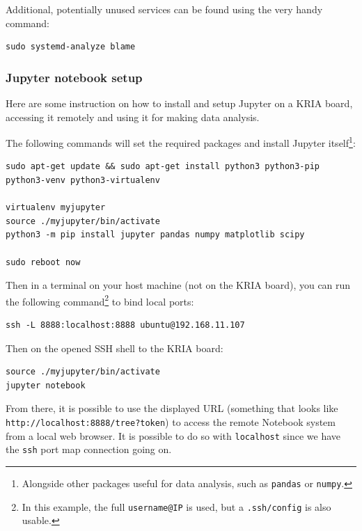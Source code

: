 \documentclass[10pt]{article}
\begin{document}
Additional, potentially unused services can be found using the very handy command:
\begin{verbatim}
sudo systemd-analyze blame
\end{verbatim}

\subsubsection{Jupyter notebook setup}
\label{sec:org8ccd1e6}
Here are some instruction on how to install and setup Jupyter on a KRIA board,
accessing it remotely and using it for making data analysis.

The following commands will set the required packages and install Jupyter itself\footnote{Alongside other packages useful for data analysis, such as \texttt{pandas} or \texttt{numpy}.}:
\begin{verbatim}
sudo apt-get update && sudo apt-get install python3 python3-pip python3-venv python3-virtualenv

virtualenv myjupyter
source ./myjupyter/bin/activate
python3 -m pip install jupyter pandas numpy matplotlib scipy

sudo reboot now
\end{verbatim}

Then in a terminal on your host machine (not on the KRIA board), you can run the following command\footnote{In this example, the full \texttt{username@IP} is used, but a \texttt{.ssh/config} is also usable.} to bind local ports:
\begin{verbatim}
ssh -L 8888:localhost:8888 ubuntu@192.168.11.107
\end{verbatim}

Then on the opened SSH shell to the KRIA board:
\begin{verbatim}
source ./myjupyter/bin/activate
jupyter notebook
\end{verbatim}

From there, it is possible to use the displayed URL (something that looks like
\texttt{http://localhost:8888/tree?token}) to access the remote Notebook system from a local web browser.
It is possible to do so with \texttt{localhost} since we have the \texttt{ssh} port map connection going on.
\end{document}
